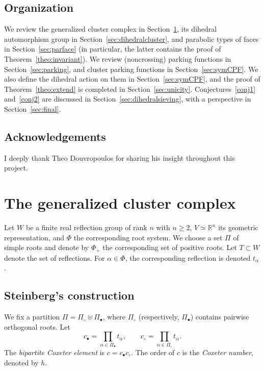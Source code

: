 \documentclass[11pt]{article}
\theoremstyle{definition}
\begin{document}
\subsection{Organization}

We review the generalized cluster complex in Section~\ref{sec:cluster}, its dihedral automorphism group in Section~\ref{sec:dihedralcluster}, and parabolic types of faces in Section~\ref{sec:parface} (in particular, the latter contains the proof of Theorem~\ref{theo:invariant}).  We review (noncrossing) parking functions in Section~\ref{sec:parking}, and cluster parking functions in Section~\ref{sec:symCPF}.  We also define the dihedral action on them in Section~\ref{sec:symCPF}, and the proof of Theorem~\ref{theo:extend} is completed in Section~\ref{sec:unicity}.  Conjectures~\ref{conj1} and~\ref{conj2} are discussed in Section~\ref{sec:dihedralsieving}, with a perspective in Section~\ref{sec:final}.

\subsection{Acknowledgements}

I deeply thank Theo Douvropoulos for sharing his insight throughout this project.  

\section{The generalized cluster complex}
\label{sec:cluster}

Let $W$ be a finite real reflection group of rank $n$ with $n\geq 2$, $V \simeq \mathbb{R}^n$ its geometric representation, and $\Phi$ the corresponding root system.  We choose a set $\Pi$ of simple roots and denote by $\Phi_+$ the corresponding set of positive roots.  Let $T\subset W$ denote the set of reflections.  For $\alpha\in \Phi$, the corresponding reflection is denoted $t_\alpha$.

\subsection{Steinberg's construction}

We fix a partition $\Pi = \Pi_\circ \uplus \Pi_\bullet$, where $\Pi_\circ$ (respectively, $\Pi_\bullet$) contains pairwise orthogonal roots. Let
\[
    c_\bullet = \prod_{\alpha \in \Pi_\bullet} t_{\alpha},\qquad
    c_\circ = \prod_{\alpha \in \Pi_\circ} t_{\alpha}.
\]
The {\it bipartite Coxeter element} is $c = c_\bullet c_\circ$.  The order of $c$ is the {\it Coxeter number}, denoted by $h$.
\end{document}
